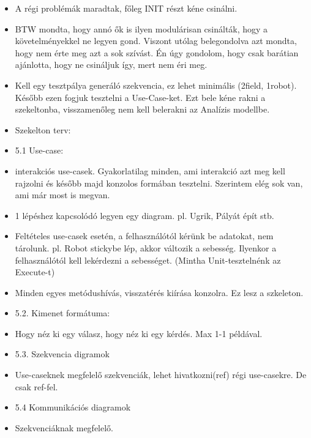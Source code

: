 \documentclass{article}
\begin{document}
\begin{itemize}
	\item A régi problémák maradtak, főleg INIT részt kéne csinálni.
	\item BTW mondta, hogy annó ők is ilyen modulárisan csinálták, hogy a követelményekkel ne legyen gond. Viszont utólag belegondolva azt mondta, hogy nem érte meg azt a sok szívást. Én úgy gondolom, hogy csak barátian ajánlotta, hogy ne csináljuk így, mert nem éri meg.
	\item Kell egy tesztpálya generáló szekvencia, ez lehet minimális (2field, 1robot). Később ezen fogjuk tesztelni a Use-Case-ket. Ezt bele kéne rakni a szekeltonba, visszamenőleg nem kell belerakni az Analízis modellbe.
	\item Szekelton terv:
	\item 5.1 Use-case:
	\item interakciós use-casek. Gyakorlatilag minden, ami interakció azt meg kell rajzolni és később majd konzolos formában tesztelni. Szerintem elég sok van, ami már most is megvan.
	\item 1 lépéshez kapcsolódó legyen egy diagram. pl. Ugrik, Pályát épít stb.
	\item Feltételes use-casek esetén, a felhasználótól kérünk be adatokat, nem tárolunk. pl. Robot stickybe lép, akkor változik a sebesség. Ilyenkor a felhasználótól kell lekérdezni a sebességet. (Mintha Unit-tesztelnénk az Execute-t)
	\item Minden egyes metódushívás, visszatérés kiírása konzolra. Ez lesz a szkeleton.
	\item 5.2. Kimenet formátuma:
	\item Hogy néz ki egy válasz, hogy néz ki egy kérdés. Max 1-1 példával.
	\item 5.3. Szekvencia digramok
	\item Use-caseknek megfelelő szekvenciák, lehet hivatkozni(ref) régi use-casekre. De csak ref-fel.
	\item 5.4 Kommunikációs diagramok
	\item Szekvenciáknak megfelelő.
\end{itemize}
\end{document}
